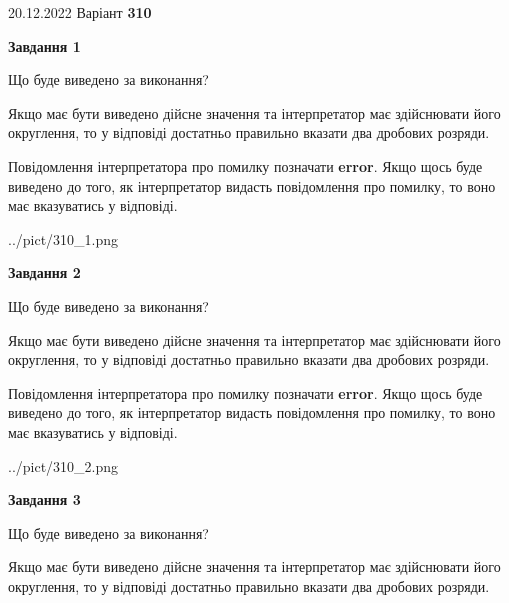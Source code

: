 \documentclass[12pt, ukrainian]{article}
\begin{document}
{20.12.2022 Варіант \No \textbf { 310 }\par}
{
\begin {Large}

{\begin {center}\textbf{Завдання 1}\end {center}}\par
Що буде виведено за виконання? \par

Якщо має бути виведено дійсне значення та інтерпретатор має здійснювати його округлення, 
то у відповіді достатньо правильно вказати два дробових розряди.

Повідомлення інтерпретатора про помилку позначати \textbf{error}.
Якщо щось буде виведено до того, як інтерпретатор видасть повідомлення про помилку, 
то воно має вказуватись у відповіді. \par

\begin{center}
	{../pict/310_1.png}
\end{center}
\newpage

{\begin {center}\textbf{Завдання 2}\end {center}}\par
Що буде виведено за виконання? \par

Якщо має бути виведено дійсне значення та інтерпретатор має здійснювати його округлення, 
то у відповіді достатньо правильно вказати два дробових розряди.

Повідомлення інтерпретатора про помилку позначати \textbf{error}.
Якщо щось буде виведено до того, як інтерпретатор видасть повідомлення про помилку, 
то воно має вказуватись у відповіді. \par

\begin{center}
	{../pict/310_2.png}
\end{center}
\newpage

{\begin {center}\textbf{Завдання 3}\end {center}}\par
Що буде виведено за виконання? \par

Якщо має бути виведено дійсне значення та інтерпретатор має здійснювати його округлення, 
то у відповіді достатньо правильно вказати два дробових розряди.


\end{Large}}
\end{document}
